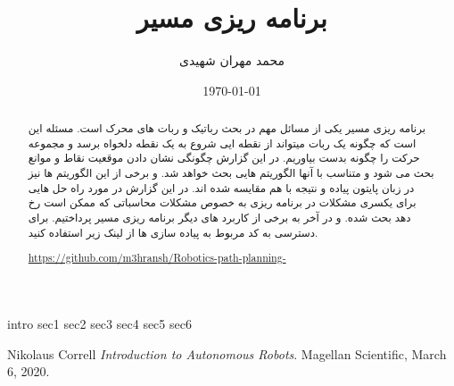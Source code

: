 \documentclass{article}
\title{برنامه ریزی مسیر}
\author{ محمد مهران شهیدی}
\date{\today}
\begin{document}
\maketitle
{}
\begin{abstract}
برنامه ریزی مسیر یکی از مسائل مهم در بحث رباتیک و ربات های محرک است. مسئله این است که چگونه یک ربات میتواند از نقطه ایی  شروع به یک نقطه دلخواه برسد و مجموعه حرکت را چگونه بدست بیاوریم. در این گزارش چگونگی نشان دادن موقعیت نقاط و موانع بحث می شود و متناسب با آنها الگوریتم هایی بحث خواهد شد. و برخی از این الگوریتم ها نیز در زبان پایتون پیاده و نتیجه با هم مقایسه شده اند. در این گزارش در مورد  راه حل هایی برای یکسری مشکلات در برنامه ریزی به خصوص مشکلات محاسباتی که ممکن است رخ دهد بحث شده. و در آخر به برخی از کاربرد های دیگر برنامه ریزی مسیر پرداختیم.
برای دسترسی به کد مربوط به پیاده سازی ها از لینک زیر استفاده کنید.
\newline
\begin{latin}
\href{https://github.com/m3hransh/Robotics-path-planning-}{https://github.com/m3hransh/Robotics-path-planning-}
\end{latin}
\end{abstract}
\indent\indent
\newpage
\tableofcontents
\newpage
{}
{intro}
{sec1}
{sec2}
{sec3}
{sec4}
{sec5}
{sec6}
\begin{thebibliography}{9}
\begin{latin} 
Nikolaus Correll 
\textit{Introduction to Autonomous Robots}. 
Magellan Scientific, March 6, 2020.
\end{latin} 


\end{thebibliography}
\end{document}
